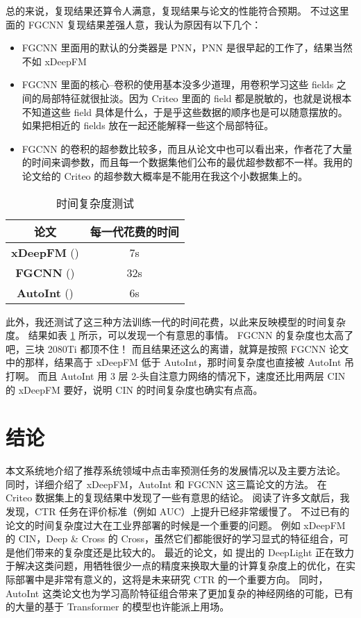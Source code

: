 \documentclass[degree=master,cjk-font=noto]{thuthesis}
\begin{document}
总的来说，复现结果还算令人满意，复现结果与论文的性能符合预期。
不过这里面的 FGCNN 复现结果差强人意，我认为原因有以下几个：

\begin{itemize}
  \item FGCNN 里面用的默认的分类器是 PNN，PNN 是很早起的工作了，结果当然不如 xDeepFM
  \item FGCNN 里面的核心--卷积的使用基本没多少道理，用卷积学习这些 fields 之间的局部特征就很扯淡。因为 Criteo 里面的 field 都是脱敏的，也就是说根本不知道这些 field 具体是什么，于是乎这些数据的顺序也是可以随意摆放的。如果把相近的 fields 放在一起还能解释一些这个局部特征。
  \item FGCNN 的卷积的超参数比较多，而且从论文中也可以看出来，作者花了大量的时间来调参数，而且每一个数据集他们公布的最优超参数都不一样。我用的论文给的 Criteo 的超参数大概率是不能用在我这个小数据集上的。
\end{itemize}

\begin{table}[htb]
  \centering
  \caption{时间复杂度测试}
  \label{tab:time_complex}
  \begin{tabular}{cc}
    \toprule
    \textbf{论文}         & \textbf{每一代花费的时间}  \\
    \midrule
    \textbf{xDeepFM} (\cite{xdeepfm}) & 7s \\
    \textbf{FGCNN} (\cite{fgcnn})           & 32s \\
    \textbf{AutoInt} (\cite{autoint})         & 6s \\
    \bottomrule
  \end{tabular}
\end{table}

此外，我还测试了这三种方法训练一代的时间花费，以此来反映模型的时间复杂度。
结果如表 \ref{tab:time_complex} 所示，可以发现一个有意思的事情。
FGCNN 的复杂度也太高了吧，三块 2080Ti 都顶不住！
而且结果还这么的离谱，就算是按照 FGCNN 论文中的那样，结果高于 xDeepFM 低于 AutoInt，那时间复杂度也直接被 AutoInt 吊打啊。
而且 AutoInt 用 3 层 2-头自注意力网络的情况下，速度还比用两层 CIN 的 xDeepFM 要好，说明 CIN 的时间复杂度也确实有点高。

\chapter{结论}

本文系统地介绍了推荐系统领域中点击率预测任务的发展情况以及主要方法论。
同时，详细介绍了 xDeepFM，AutoInt 和 FGCNN 这三篇论文的方法。
在 Criteo 数据集上的复现结果中发现了一些有意思的结论。
阅读了许多文献后，我发现，CTR 任务在评价标准（例如 AUC）上提升已经非常缓慢了。
不过已有的论文的时间复杂度过大在工业界部署的时候是一个重要的问题。
例如 xDeepFM 的 CIN，Deep \& Cross 的 Cross，虽然它们都能很好的学习显式的特征组合，可是他们带来的复杂度还是比较大的。
最近的论文，如 \cite{deeplight} 提出的 DeepLight 正在致力于解决这类问题，用牺牲很少一点的精度来换取大量的计算复杂度上的优化，在实际部署中是非常有意义的，这将是未来研究 CTR 的一个重要方向。
同时，AutoInt 这类论文也为学习高阶特征组合带来了更加复杂的神经网络的可能，已有的大量的基于 Transformer 的模型也许能派上用场。
\end{document}
